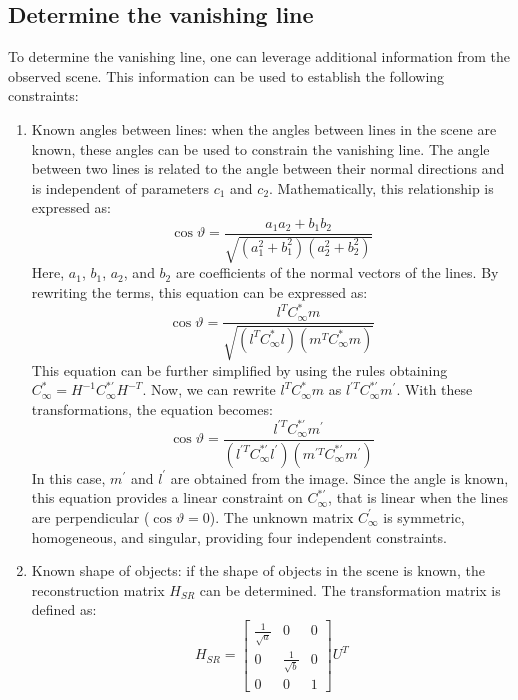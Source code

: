 \documentclass[12pt, a4paper]{report}
\begin{document}
    \subsection{Determine the vanishing line}
    To determine the vanishing line, one can leverage additional information from the observed scene. 
    This information can be used to establish the following constraints:
    \begin{enumerate}
        \item Known angles between lines: when the angles between lines in the scene are known, these angles can be used to constrain the vanishing line. 
            The angle between two lines is related to the angle between their normal directions and is independent of parameters $c_1$ and $c_2$. 
            Mathematically, this relationship is expressed as:
            \[\cos\vartheta=\dfrac{a_1a_2+b_1b_2}{\sqrt{(a_1^2+b_1^2)(a_2^2+b_2^2)}}\]
            Here, $a_1$, $b_1$, $a_2$, and $b_2$ are coefficients of the normal vectors of the lines. 
            By rewriting the terms, this equation can be expressed as: 
            \[\cos\vartheta=\dfrac{l^TC_{\infty}^{*}m}{\sqrt{(l^TC_{\infty}^{*}l)(m^TC_{\infty}^{*}m)}}\]
            This equation can be further simplified by using the rules obtaining $C_{\infty}^{*}=H^{-1}C_{\infty}^{*'}H^{-T}$.  
            Now, we can rewrite $l^TC_{\infty}^{*}m$ as $l^{'T}C_{\infty}^{*'}m^{'}$. 
            With these transformations, the equation becomes:
            \[\cos\vartheta=\dfrac{l^{'T}C_{\infty}^{*'}m^{'}}{(l^{'T}C_{\infty}^{*'}l^{'})(m^{'T}C_{\infty}^{*'}m^{'})}\]
            In this case, $m^{'}$ and $l^{'}$ are obtained from the image. 
            Since the angle is known, this equation provides a linear constraint on $C_{\infty}^{*'}$, that is linear when the lines are perpendicular ($\cos\vartheta=0$).
            The unknown matrix $C_{\infty}^{'}$ is symmetric, homogeneous, and singular, providing four independent constraints.
        \item Known shape of objects: if the shape of objects in the scene is known, the reconstruction matrix $H_{SR}$ can be determined. 
            The transformation matrix is defined as:
            \[H_{SR}=
            \begin{bmatrix}
                \frac{1}{\sqrt{a}} & 0 & 0 \\
                0 & \frac{1}{\sqrt{b}} & 0 \\
                0 & 0 & 1
            \end{bmatrix}
            U^T
            \]

\end{enumerate}
\end{document}
